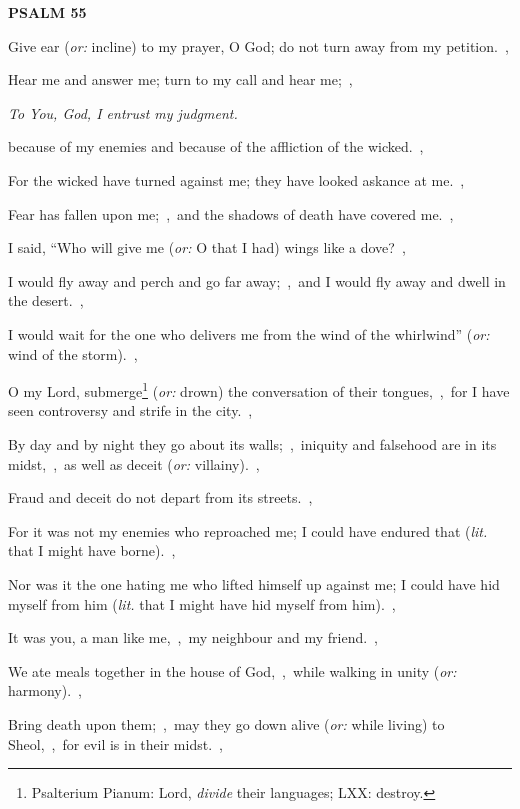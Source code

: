 \documentclass[12pt,twoside,a5paper]{article}
\newcommand{\psalm}[1]{\textbf{PSALM {#1}}\nopagebreak}
\newcommand{\qanona}[1]{{\liturgicalhint{Qanona.} \emph{#1}}}
\newcommand{\translationoption}[1]{\emph{or:} #1}
\newcommand{\translationliteral}[1]{\emph{lit.} #1}
\begin{document}
\psalm{55}

\begin{normalparskip}
  Give ear (\translationoption{incline}) to my prayer, O God; do not turn away from my petition.~\sep

  Hear me and answer me; turn to my call and hear me;~\sep

  \qanona{To You, God, I entrust my judgment.}

  because of my enemies and because of the affliction of the wicked.~\sep

  For the wicked have turned against me; they have looked askance at me.~\sep

  Fear has fallen upon me;~\sep\ and the shadows of death have covered me.~\sep

  I said, ``Who will give me (\translationoption{O that I had}) wings like a dove?~\sep

  I would fly away and perch and go far away;~\sep\ and I would fly away and dwell in the desert.~\sep

  I would wait for the one who delivers me from the wind of the whirlwind'' (\translationoption{wind of the storm}).~\sep

  O my Lord, submerge\footnote{Psalterium Pianum: Lord, \emph{divide} their languages; LXX: destroy.} (\translationoption{drown}) the conversation of their tongues,~\sep\ for I have seen controversy and strife in the city.~\sep

  By day and by night they go about its walls;~\sep\ iniquity and falsehood are in its midst,~\sep\ as well as deceit (\translationoption{villainy}).~\sep

  Fraud and deceit do not depart from its streets.~\sep

  For it was not my enemies who reproached me; I could have endured that (\translationliteral{that I might have borne}).~\sep

  Nor was it the one hating me who lifted himself up against me; I could have hid myself from him (\translationliteral{that I might have hid myself from him}).~\sep

  It was you, a man like me,~\sep\ my neighbour and my friend.~\sep

  We ate meals together in the house of God,~\sep\ while walking in unity (\translationoption{harmony}).~\sep

  Bring death upon them;~\sep\ may they go down alive (\translationoption{while living}) to Sheol,~\sep\ for evil is in their midst.~\sep


\end{normalparskip}
\end{document}
